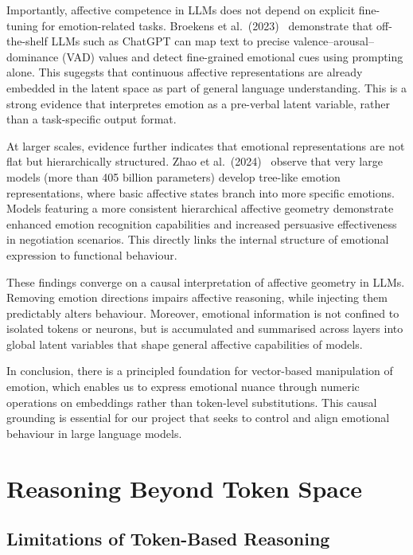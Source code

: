 \documentclass[12pt,twoside]{report}
\begin{document}
Importantly, affective competence in LLMs does not depend on explicit fine-tuning for emotion-related tasks. Broekens et al.\ (2023)~\cite{broekens2023finegrainedaffectiveprocessingcapabilities} demonstrate that off-the-shelf LLMs such as ChatGPT can map text to precise valence–arousal–dominance (VAD) values and detect fine-grained emotional cues using prompting alone. This sugegsts that continuous affective representations are already embedded in the latent space as part of general language understanding. This is a strong evidence that interpretes emotion as a pre-verbal latent variable, rather than a task-specific output format.

At larger scales, evidence further indicates that emotional representations are not flat but hierarchically structured. Zhao et al.\ (2024)~\cite{zhao2025emergencehierarchicalemotionorganization} observe that very large models (more than 405 billion parameters) develop tree-like emotion representations, where basic affective states branch into more specific emotions. Models featuring a more consistent hierarchical affective geometry demonstrate enhanced emotion recognition capabilities and increased persuasive effectiveness in negotiation scenarios. This directly links the internal structure of emotional expression to functional behaviour.

These findings converge on a causal interpretation of affective geometry in LLMs. Removing emotion directions impairs affective reasoning, while injecting them predictably alters behaviour. Moreover, emotional information is not confined to isolated tokens or neurons, but is accumulated and summarised across layers into global latent variables that shape general affective capabilities of models.

In conclusion, there is a principled foundation for vector-based manipulation of emotion, which enables us to express emotional nuance through numeric operations on embeddings rather than token-level substitutions. This causal grounding is essential for our project that seeks to control and align emotional behaviour in large language models.

\section{Reasoning Beyond Token Space}

\subsection{Limitations of Token-Based Reasoning}
\end{document}
